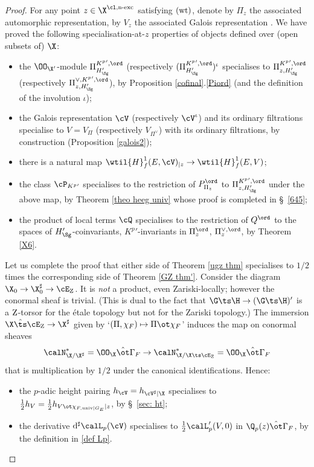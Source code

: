 \begin{proof}
 For any point   $z\in \X^{\cl, \textup{n-exc}}$ satisfying $\textup{(wt)}$,  denote  by $\Pi_{z}$ the associated automorphic representation, by $V_{z}$  the associated Galois representation . We have   proved the following specialisation-at-$z$ properties of objects defined  over (open subsets of)  $\X$:
\begin{itemize}
\item the $\OO_{\X'}$-module $\Pi_{H'_{\Sg}}^{K^{p}{}', \ord}$ (respectively $(\Pi_{H'_{\Sg}}^{K^{p}{}', \ord})^{\iota}$  specialises to $\Pi_{z,H'_{\Sg}}^{K^{p}{}', \ord}$ (respectively  $\Pi_{z,H'_{\Sg}}^{\vee, K^{p}{}', \ord}$), by Proposition \ref{cofinal}.\ref{Piord} (and the definition of the involution $\iota$);
\item the Galois representation $\cV$  (respectively $\cV^{\iota}$) and its ordinary filtrations  specialise to $V=V_{\Pi}$ (respectively $V_{\Pi^{\vee}}$)  with its ordinary filtrations, by construction (Proposition \ref{galois2});
\item there is a natural map $\wtil{H}^{1}_{f}(E, \cV)_{|z}\to \wtil{H}^{1}_{f}(E, V)$;
\item  the class $\cP_{K^{p}{}'}$ specialises to the restriction of $P^{\ord}_{\Pi_{z}}$ to $\Pi_{z,H'_{\Sg}}^{K^{p}{}', \ord}$ under the above map, by  Theorem   \ref{theo heeg univ} whose proof is completed in \S~\ref{645};
\item the product of local terms $\cQ$ specialises to the restriction of $Q^{\ord} $ to the spaces of $H'_{\Sg}$-coinvariants, $K^{p}{}'$-invariants in $\Pi_{z}^{\ord}$, $\Pi_{z}^{\vee,\ord}$,
 by Theorem \ref{X6}.
\end{itemize}
Let us  complete the proof  that either side of Theorem \ref{ugz thm} specialises to $1/2$ times the corresponding side of Theorem \ref{GZ thm'}.  Consider the diagram $\X_{0}\to \X_{0}^{\sharp}\to \cE_{\rm Z}$. It is \emph{not} a product, even Zariski-locally; however  the
conormal sheaf is trivial. (This is dual to the fact that $\G\ts\H\to (\G\ts\H)'$ is a ${\rm Z}$-torsor for the \'etale topology but  {not} for the Zariski topology.)  The    immersion $\X\hat{\ts} \cE_{\rm Z}\to \X^{\sharp}$ given by `$(\Pi, \chi_{F})\mapsto \Pi\ot \chi_{F}$' induces the map on conormal sheaves
$$\calN_{\X/\X^{\sharp}}^{*}=\OO_{\X}\hat{\ot} \Gamma_{F} \to
\calN_{\X/\X\ts \cE_{\rm Z}}^{*} = \OO_{\X}\hat{\ot} \Gamma_{F} $$
  that is multiplication by $1/2$
 under the canonical identifications. Hence:
\begin{itemize}
\item the $p$-adic height pairing ${h}_{\cV}=h_{\cV^{\sharp}|\X}$ specialises to
${1\over 2} h_{V}={1\over 2} h_{V\ot \chi_{F, {\rm univ}|G_{E} }| z}$, by \S~\ref{sec: ht};
\item the derivative ${\rm d}^{\sharp} \calL_{p}(\cV)$   specialises to ${1\over 2} \calL_{p}'(V, 0)$ in $\Q_{p}(z)\hat{\ot} \Gamma_{F}$,  by the definition in \eqref{def Lp}.
\end{itemize}


\end{proof}
